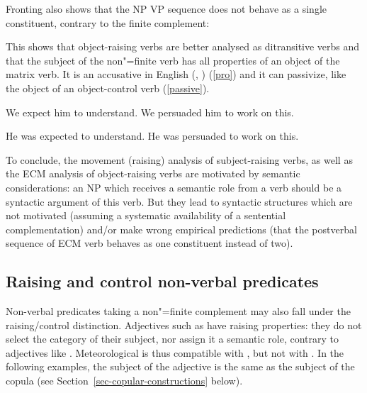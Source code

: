 \documentclass[output=paper
	        ,collection
	        ,collectionchapter
 	        ,biblatex
                ,babelshorthands
                ,newtxmath
                ,draftmode
                ,colorlinks, citecolor=brown
]{langscibook}
\begin{document}
Fronting also shows that the NP VP sequence does not behave as a single constituent, contrary to the finite complement:

\eal
{}
\zl


This shows that object-raising verbs are better analysed as ditransitive verbs and that the subject of the non"=finite verb has all properties of an object of the matrix verb. It is an accusative in English (, ) (\ref{pro}) and it can passivize, like the object of an object-control verb (\ref{passive}).

\begin{exe}
\ex
\begin{xlist} \label{pro}
\ex We expect him to understand.
\ex  We persuaded him to work on this.
\end{xlist}
\ex \begin{xlist} \label{passive}
\ex  He was expected to understand.
\ex  He was persuaded to work on this.
\end{xlist}
	
\end{exe}


To conclude, the movement (raising) analysis of subject-raising verbs, as well as the ECM analysis of object-raising verbs are motivated by semantic considerations: an NP which receives a semantic role from a verb should be a syntactic argument of this verb. But they lead to syntactic structures which are not motivated (assuming a systematic availability of a sentential complementation) and/or make wrong empirical predictions (that the postverbal sequence of ECM verb behaves as one constituent instead of two).
 
\subsection{Raising and control non-verbal predicates}\label{nonverbal}

Non-verbal predicates taking a non"=finite complement may also fall under the raising/control distinction.  Adjectives such as  have raising properties: they do not select the category of their subject, nor assign it a semantic role, contrary to adjectives like . Meteorological  is thus compatible with , but not with . In the following examples, the subject of the adjective is the same as the subject of the copula (see Section~\ref{sec-copular-constructions} below).
\end{document}
